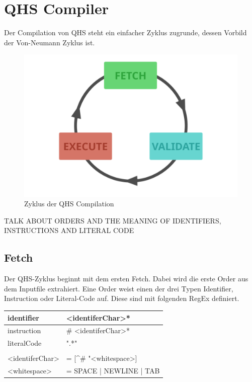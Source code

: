 \chapter{QHS Compiler}
Der Compilation von QHS steht ein einfacher Zyklus zugrunde, dessen Vorbild der Von-Neumann Zyklus ist.

\begin{figure}[h!]
    \centering
    \includegraphics[scale=0.6]{resources/qhs-cycle.png}
    \caption{Zyklus der QHS Compilation}
    \label{fig:qhs-cycle}
\end{figure}

TALK ABOUT ORDERS AND THE MEANING OF IDENTIFIERS, INSTRUCTIONS AND LITERAL CODE

\section{Fetch} \label{sec:qhs-fetch}
Der QHS-Zyklus beginnt mit dem ersten Fetch. Dabei wird die erste Order aus dem Inputfile extrahiert. Eine Order weist einen der drei Typen Identifier, Instruction oder Literal-Code auf. Diese sind mit folgenden RegEx definiert.

\begin{table}[h]
    \centering
    \begin{tabular}{ll}
    \multicolumn{1}{l|}{identifier}        & \textless{}identiferChar\textgreater{}*                           \\ \hline
    \multicolumn{1}{l|}{instruction}       & \# \textless{}identiferChar\textgreater{}*                        \\ \hline
    \multicolumn{1}{l|}{literalCode}       & ".*"                                                              \\
                                           &                                                                   \\
    \textless{}identiferChar\textgreater{} & = {[}\textasciicircum{}\# "\textless{}whitespace\textgreater{}{]} \\
    \textless{}whitespace\textgreater{}    & = SPACE | NEWLINE | TAB
    
    \end{tabular}
\end{table}

